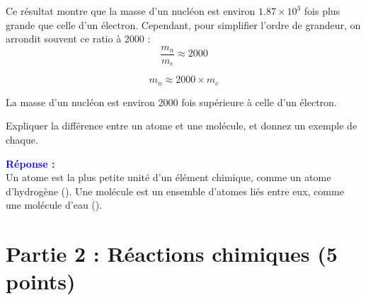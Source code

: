 \documentclass{exam}
\begin{document}
\begin{questions}
Ce résultat montre que la masse d'un nucléon est environ \(1.87 \times 10^3\) fois plus grande que celle d'un électron. Cependant, pour simplifier l'ordre de grandeur, on arrondit souvent ce ratio à 2000 :
\[
\frac{m_n}{m_e} \approx 2000
\]

\[
m_n \approx 2000 \times {m_e}
\]
  
  La masse d'un nucléon est environ 2000 fois supérieure à celle d'un électron.

  \question[0.5] Expliquer la différence entre un atome et une molécule, et donnez un exemple de chaque.

  \textbf{\textcolor{blue}{Réponse :}} \\
  Un atome est la plus petite unité d’un élément chimique, comme un atome d'hydrogène (). Une molécule est un ensemble d’atomes liés entre eux, comme une molécule d'eau ().

\end{questions}

\section*{Partie 2 : Réactions chimiques (5 points)}
\end{document}
